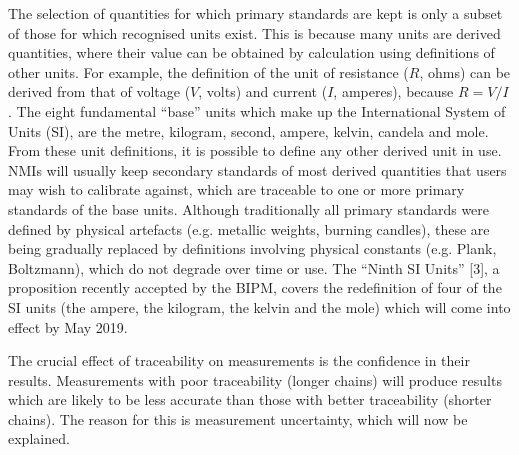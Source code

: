 \documentclass[../thesis.tex]{subfiles}
\begin{document}
\begin{refsection}
The selection of quantities for which primary standards are kept is only a subset of those for which recognised units exist. This is because many units are derived quantities, where their value can be obtained by calculation using definitions of other units. For example, the definition of the unit of resistance ($R$, ohms) can be derived from that of voltage ($V$, volts) and current ($I$, amperes), because $R=V/I$. The eight fundamental ``base'' units which make up the International System of Units (SI), are the metre, kilogram, second, ampere, kelvin, candela and mole. From these unit definitions, it is possible to define any other derived unit in use. NMIs will usually keep secondary standards of most derived quantities that users may wish to calibrate against, which are traceable to one or more primary standards of the base units. Although traditionally all primary standards were defined by physical artefacts (e.g. metallic weights, burning candles), these are being gradually replaced by definitions involving physical constants (e.g. Plank, Boltzmann), which do not degrade over time or use. The ``Ninth SI Units'' [3], a proposition recently accepted by the BIPM, covers the redefinition of four of the SI units (the ampere, the kilogram, the kelvin and the mole) which will come into effect by May 2019.

The crucial effect of traceability on measurements is the confidence in their results. Measurements with poor traceability (longer chains) will produce results which are likely to be less accurate than those with better traceability (shorter chains). The reason for this is measurement uncertainty, which will now be explained.


\end{refsection}
\end{document}
